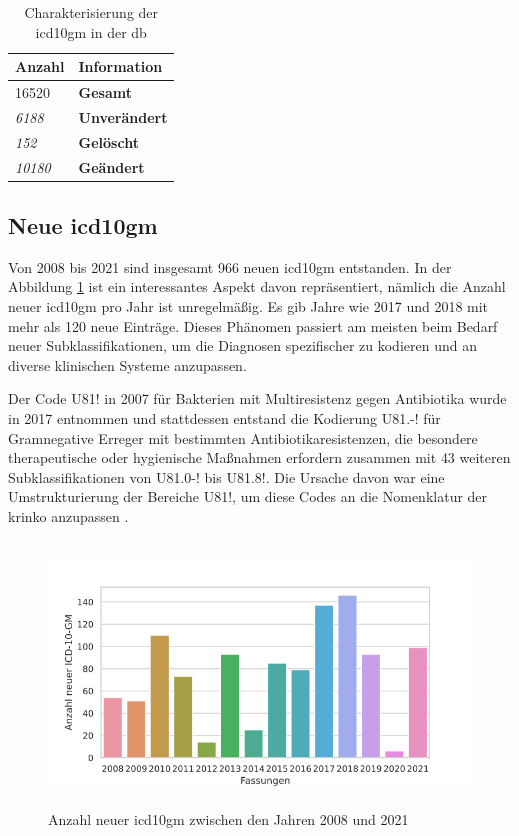  \begin{table}[ht]
 	\centering
 	\small
 	\caption[\acs{icd10gm} in der \acs{db}]{Charakterisierung der \acs{icd10gm} in der \ac{db}}
 	\label{tab:icddb}
 	\begin{tabular}{|l|l|}
 		\hline
 		\rowcolor{lightgray}	Anzahl & Information \\ \hline 
 		16520 & \textbf{Gesamt} \\ \hline
 		\hline
 		\textit{6188} & \textbf{Unverändert} \\ \hline
 		\textit{152} & \textbf{Gelöscht} \\ \hline
 		\textit{10180} & \textbf{Geändert} \\ \hline
 	\end{tabular}
 \end{table}

\newpage

\subsection{Neue \acs{icd10gm}} \label{newicd}

Von 2008 bis 2021 sind insgesamt \textsf{966} neuen \ac{icd10gm} entstanden. In der Abbildung \ref{fig:newicdyear} ist ein interessantes Aspekt davon repräsentiert, nämlich die Anzahl neuer \ac{icd10gm} pro Jahr ist unregelmäßig. Es gib Jahre wie 2017 und 2018 mit mehr als \textsf{120} neue Einträge. Dieses Phänomen passiert am meisten beim Bedarf neuer Subklassifikationen, um die Diagnosen spezifischer zu kodieren und an diverse klinischen Systeme anzupassen.

Der Code \textsf{U81!} in 2007 für \textsf{Bakterien mit Multiresistenz gegen Antibiotika} wurde in 2017 entnommen und stattdessen entstand die Kodierung \textsf{U81.-!} für \textsf{Gramnegative Erreger mit bestimmten Antibiotikaresistenzen, die besondere therapeutische oder hygienische Maßnahmen erfordern} zusammen mit \textsf{43} weiteren Subklassifikationen von \textsf{U81.0-!} bis \textsf{U81.8!}. Die Ursache davon war eine Umstrukturierung der Bereiche \textsf{U81!}, um diese Codes an die Nomenklatur der \ac{krinko} anzupassen \cite{erreg17}. 

\begin{figure}[ht]
	\centering
	\includegraphics[height=7cm]{figures/newicdyear}
	\caption[Neue \acs{icd10gm} pro Jahr]{Anzahl neuer \acs{icd10gm} zwischen den Jahren 2008 und 2021}
	\label{fig:newicdyear}
\end{figure} 

